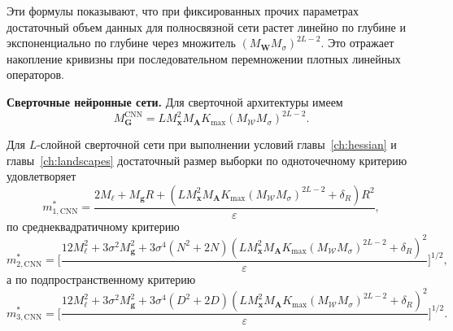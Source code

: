 Эти формулы показывают, что при фиксированных прочих параметрах достаточный объем данных для полносвязной сети растет линейно по глубине и экспоненциально по глубине через множитель $(M_{\mathbf W}M_{\sigma})^{2L-2}$. Это отражает накопление кривизны при последовательном перемножении плотных линейных операторов.

\textbf{Сверточные нейронные сети.} Для сверточной архитектуры имеем
\begin{equation}
    M_{\mathbf G}^{\mathrm{CNN}}
    =
    L M_{\mathbf x}^2 M_{\mathbf A}K_{\max}(M_{\mathcal W}M_{\sigma})^{2L-2}.
\end{equation}

\begin{corollary}
    \label{cor:scaling-cnn-sizes}
    Для $L$-слойной сверточной сети при выполнении условий главы~\ref{ch:hessian} и главы~\ref{ch:landscapes} достаточный размер выборки по одноточечному критерию удовлетворяет
    \begin{equation}
        \label{eq:scaling-cnn-m1}
        m_{1,\mathrm{CNN}}^*
        =
        \frac{
            2M_{\ell}
            +
            M_{\mathbf g}R
            +
            \left(
                L M_{\mathbf x}^2 M_{\mathbf A}K_{\max}(M_{\mathcal W}M_{\sigma})^{2L-2}
                +\delta_R
            \right)R^2
        }{\varepsilon},
    \end{equation}
    по среднеквадратичному критерию
    \begin{equation}
        \label{eq:scaling-cnn-m2}
        m_{2,\mathrm{CNN}}^*
        =
        \Bigg[
            \frac{
                12M_{\ell}^2
                +
                3\sigma^2 M_{\mathbf g}^2
                +
                3\sigma^4(N^2+2N)
                \left(
                    L M_{\mathbf x}^2 M_{\mathbf A}K_{\max}(M_{\mathcal W}M_{\sigma})^{2L-2}
                    +\delta_R
                \right)^2
            }{\varepsilon}
        \Bigg]^{1/2},
    \end{equation}
    а по подпространственному критерию
    \begin{equation}
        \label{eq:scaling-cnn-m3}
        m_{3,\mathrm{CNN}}^*
        =
        \Bigg[
            \frac{
                12M_{\ell}^2
                +
                3\sigma^2 M_{\mathbf g}^2
                +
                3\sigma^4(D^2+2D)
                \left(
                    L M_{\mathbf x}^2 M_{\mathbf A}K_{\max}(M_{\mathcal W}M_{\sigma})^{2L-2}
                    +\delta_R
                \right)^2
            }{\varepsilon}
        \Bigg]^{1/2}.
    \end{equation}
\end{corollary}

